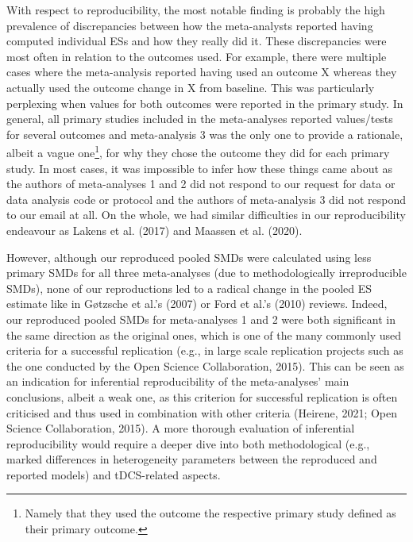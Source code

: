 \documentclass[
  man,floatsintext]{apa6}
\begin{document}
With respect to reproducibility, the most notable finding is probably the high prevalence of discrepancies between how the meta-analysts reported having computed individual ESs and how they really did it. These discrepancies were most often in relation to the outcomes used. For example, there were multiple cases where the meta-analysis reported having used an outcome X whereas they actually used the outcome change in X from baseline. This was particularly perplexing when values for both outcomes were reported in the primary study. In general, all primary studies included in the meta-analyses reported values/tests for several outcomes and meta-analysis 3 was the only one to provide a rationale, albeit a vague one\footnote{Namely that they used the outcome the respective primary study defined as their primary outcome.}, for why they chose the outcome they did for each primary study. In most cases, it was impossible to infer how these things came about as the authors of meta-analyses 1 and 2 did not respond to our request for data or data analysis code or protocol and the authors of meta-analysis 3 did not respond to our email at all. On the whole, we had similar difficulties in our reproducibility endeavour as Lakens et al. (2017) and Maassen et al. (2020).

However, although our reproduced pooled SMDs were calculated using less primary SMDs for all three meta-analyses (due to methodologically irreproducible SMDs), none of our reproductions led to a radical change in the pooled ES estimate like in Gøtzsche et al.'s (2007) or Ford et al.'s (2010) reviews. Indeed, our reproduced pooled SMDs for meta-analyses 1 and 2 were both significant in the same direction as the original ones, which is one of the many commonly used criteria for a successful replication (e.g., in large scale replication projects such as the one conducted by the Open Science Collaboration, 2015). This can be seen as an indication for inferential reproducibility of the meta-analyses' main conclusions, albeit a weak one, as this criterion for successful replication is often criticised and thus used in combination with other criteria (Heirene, 2021; Open Science Collaboration, 2015). A more thorough evaluation of inferential reproducibility would require a deeper dive into both methodological (e.g., marked differences in heterogeneity parameters between the reproduced and reported models) and tDCS-related aspects.
\end{document}
